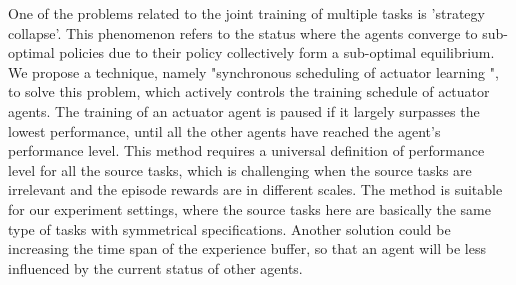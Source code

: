 One of the problems related to the joint training of multiple tasks is 'strategy collapse'. This phenomenon refers to the status where the agents converge to sub-optimal policies due to their policy collectively form a sub-optimal equilibrium. We propose a technique, namely "synchronous scheduling of actuator learning ", to solve this problem, which actively controls the training schedule of actuator agents. The training of an actuator agent is paused if it largely surpasses the lowest performance, until all the other agents have reached the agent's performance level. This method requires a universal definition of performance level for all the source tasks, which is challenging when the source tasks are irrelevant and the episode rewards are in different scales. The method is suitable for our experiment settings, where the source tasks here are basically the same type of tasks with symmetrical specifications. Another solution could be increasing the time span of the experience buffer, so that an agent will be less influenced by the current status of other agents.

